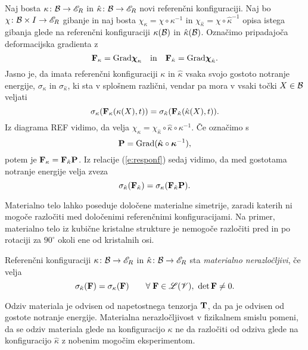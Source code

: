 Naj bosta $\kappa\colon\mathcal B\to\mathscr E_R$ in $\hat{\kappa}\colon\mathcal B\to\mathscr E_R$ novi referenčni konfiguraciji.
Naj bo $\chi\colon\mathcal B\times I\to\mathscr E_R$ gibanje in naj bosta
$\chi_{\kappa}=\chi\circ\kappa^{-1}$ in $\chi_{\hat{\kappa}}=\chi\circ\hat{\kappa}^{-1}$
opisa istega gibanja glede na referenčni konfiguraciji $\kappa(\mathcal B)$ in $\hat{\kappa}(\mathcal B)$.
Označimo pripadajoča deformacijska gradienta z
\[
	\mathbf F_{\kappa}=\mathrm{Grad}\boldsymbol \chi_{\kappa}\quad \mathrm{in}\quad
	\mathbf F_{\hat{\kappa}}=\mathrm{Grad}\boldsymbol \chi_{\hat{\kappa}}.
\]
Jasno je, da imata referenčni konfiguraciji $\kappa$ in $\hat{\kappa}$ vsaka
svojo gostoto notranje energije, $\sigma_{\kappa}$ in $\sigma_{\hat{\kappa}}$,
ki sta v splošnem različni, vendar pa mora v vsaki točki $X\in\mathcal B$ veljati
\begin{equation} \label{e:responf}
	\sigma_{\kappa}(\mathbf F_{\kappa}(\kappa(X),t))
	=\sigma_{\hat{\kappa}}(\mathbf F_{\hat{\kappa}}(\hat{\kappa}(X),t)).
\end{equation}
Iz diagrama REF vidimo, da velja $\chi_{\kappa}=\chi_{\hat{\kappa}}\circ\hat{\kappa}\circ\kappa^{-1}$.
Če označimo s
\begin{equation} \label{e:pupa}
	\mathbf P=\mathrm{Grad}(\hat{\boldsymbol \kappa}\circ\boldsymbol \kappa^{-1}),
\end{equation}
potem je $\mathbf F_{\kappa}=\mathbf F_{\hat{\kappa}}\mathbf P$. Iz relacije (\ref{e:responf})
sedaj vidimo, da med gostotama notranje energije velja zveza
\begin{equation} \label{e:dolgnoc}
	\sigma_{\hat{\kappa}}(\mathbf F_{\hat{\kappa}})
	=\sigma_{\kappa}(\mathbf F_{\hat{\kappa}}\mathbf P).
\end{equation}

Materialno telo lahko poseduje določene materialne simetrije, zaradi katerih ni mogoče razločiti
med določenimi referenčnimi konfiguracijami. Na primer, materialno telo iz
kubične kristalne strukture je nemogoče razločiti pred in po rotaciji za
$90^{\circ}$ okoli ene od kristalnih osi.

\begin{definicija}
	Referenčni konfiguraciji $\kappa\colon\mathcal B\to\mathscr E_R$ in $\hat{\kappa}\colon\mathcal B\to\mathscr E_R$
	sta \emph{materialno nerazločljivi}, če velja
	\begin{equation} \label{e:grarefc}
		\sigma_{\hat{\kappa}}(\mathbf F)=\sigma_{\kappa}(\mathbf F)
		\qquad\forall\;\mathbf F\in\mathscr L(\mathscr V),\ \det\mathbf F\neq 0.
	\end{equation}
\end{definicija}

Odziv materiala je odvisen od napetostnega tenzorja $\mathbf T$, da pa je odvisen
od gostote notranje energije.
Materialna nerazločljivost v fizikalnem smislu pomeni, da se odziv materiala
glede na konfiguracijo $\kappa$ ne da razločiti od odziva glede na konfiguracijo
$\hat{\kappa}$ z nobenim mogočim eksperimentom.

